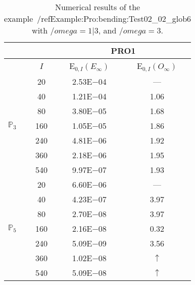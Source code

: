 \begin{table}[H]
\caption{Numerical results of the example~/ref{Example:Pro:bending:Test02_02_glob6} with $/omega=1|3$, and $/omega=3$.}
\setlength{\tabcolsep}{5pt}
\centering
\begin{tabular}{@{}l c c c@{}}
\toprule
 &  & \multicolumn{2}{c}{PRO1}\\
\midrule
 & $I$ & E$_{0,I}(E_{\infty})$ & E$_{0,I}(O_{\infty})$\\
\midrule
\multirow{7}{*}{$\mathbb{P}_{3}$}
 & 20 & 2.53E$-$04 & ---\\
 & 40 & 1.21E$-$04 & 1.06\\
 & 80 & 3.80E$-$05 & 1.68\\
 & 160 & 1.05E$-$05 & 1.86\\
 & 240 & 4.81E$-$06 & 1.92\\
 & 360 & 2.18E$-$06 & 1.95\\
 & 540 & 9.97E$-$07 & 1.93\\
\midrule
\multirow{7}{*}{$\mathbb{P}_{5}$}
 & 20 & 6.60E$-$06 & ---\\
 & 40 & 4.23E$-$07 & 3.97\\
 & 80 & 2.70E$-$08 & 3.97\\
 & 160 & 2.16E$-$08 & 0.32\\
 & 240 & 5.09E$-$09 & 3.56\\
 & 360 & 1.02E$-$08 & $\uparrow$\\
 & 540 & 5.09E$-$08 & $\uparrow$\\
\bottomrule
\end{tabular}
\label{Table:PRO:test_02_02_test23_pro3}
\end{table}
